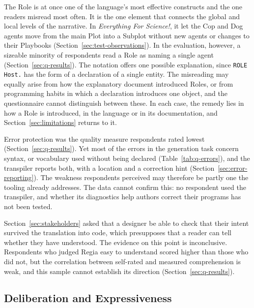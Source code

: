 The Role is at once one of the language's most effective constructs and the one readers misread most often. It is the one element that connects the global and local levels of the narrative. In \emph{Everything For Science!}, it let the Cop and Dog agents move from the main Plot into a Subplot without new agents or changes to their Playbooks (Section~\ref{sec:test-observations}). In the evaluation, however, a sizeable minority of respondents read a Role as naming a single agent (Section~\ref{sec:q-results}). The notation offers one possible explanation, since \lstinline|ROLE Host.| has the form of a declaration of a single entity. The misreading may equally arise from how the explanatory document introduced Roles, or from programming habits in which a declaration introduces one object, and the questionnaire cannot distinguish between these. In each case, the remedy lies in how a Role is introduced, in the language or in its documentation, and Section~\ref{sec:limitations} returns to it.

Error protection was the quality measure respondents rated lowest (Section~\ref{sec:q-results}). Yet most of the errors in the generation task concern syntax, or vocabulary used without being declared (Table~\ref{tab:q-errors}), and the transpiler reports both, with a location and a correction hint (Section~\ref{sec:error-reporting}). The weakness respondents perceived may therefore be partly one the tooling already addresses. The data cannot confirm this: no respondent used the transpiler, and whether its diagnostics help authors correct their programs has not been tested.

Section~\ref{sec:stakeholders} asked that a designer be able to check that their intent survived the translation into code, which presupposes that a reader can tell whether they have understood. The evidence on this point is inconclusive. Respondents who judged Regia easy to understand scored higher than those who did not, but the correlation between self-rated and measured comprehension is weak, and this sample cannot establish its direction (Section~\ref{sec:q-results}).

\subsection{Deliberation and Expressiveness}
\label{sec:discussion-expressiveness}
 
